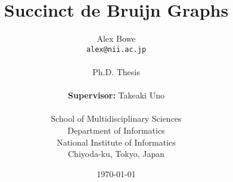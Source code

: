 \documentclass[11pt,a4paper]{report}
\begin{document}
\title{Succinct de Bruijn Graphs}
\author{Alex Bowe\\
\texttt{alex@nii.ac.jp} \\ \\
Ph.D. Thesis\\ \\
\textbf{Supervisor:} Takeaki Uno\\ \\
School of Multidisciplinary Sciences \\
Department of Informatics \\
National Institute of Informatics \\
Chiyoda-ku, Tokyo, Japan}

\date{\today}



%

\setcounter{tocdepth}{1}



%
%
%
%
%
%
%
%
%
%
%

%

\nocite{*} %



\end{document}
